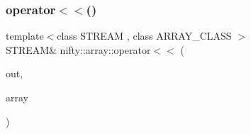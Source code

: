 \subsubsection{\texorpdfstring{operator$<$$<$()}{operator<<()}}
{\footnotesize\ttfamily template$<$class S\+T\+R\+E\+AM , class A\+R\+R\+A\+Y\+\_\+\+C\+L\+A\+SS $>$ \\
S\+T\+R\+E\+AM\& nifty\+::array\+::operator$<$$<$ (\begin{DoxyParamCaption}\item[{S\+T\+R\+E\+AM \&}]{out,  }\item[{const \hyperlink{classnifty_1_1array_1_1ArrayExtender}{Array\+Extender}$<$ A\+R\+R\+A\+Y\+\_\+\+C\+L\+A\+SS $>$ \&}]{array }\end{DoxyParamCaption})}

